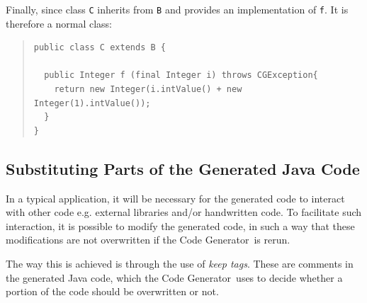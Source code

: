 \documentclass[\pformat,11pt]{article}
\newcommand{\tcg}{the Code Generator}
\begin{document}
Finally, since class \texttt{C} inherits from \texttt{B} and provides
an implementation of \texttt{f}. It is therefore a normal class:
\begin{quote}
\begin{verbatim}
public class C extends B {
 
  public Integer f (final Integer i) throws CGException{
    return new Integer(i.intValue() + new Integer(1).intValue());
  }
} 
\end{verbatim}
\end{quote}


\subsection{Substituting Parts of the Generated Java Code}\label{substituting}

In a typical application, it will be necessary for the generated code
to interact with other code e.g. external libraries and/or handwritten
code. To facilitate such interaction, it is possible to modify the
generated code, in such a way that these modifications are not
overwritten if \tcg\ is rerun.

The way this is achieved is through the use of \textit{keep
tags}. These are comments in the generated Java code, which \tcg\ uses
to decide whether a portion of the code should be overwritten or not.
\end{document}
